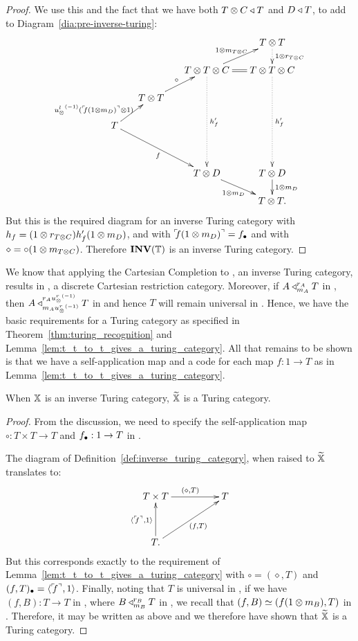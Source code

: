 \begin{proof}
  We use this and the fact that we have both $T\otimes C \triangleleft T$
  and $D \triangleleft T$, to add to   Diagram~\ref{dia:pre-inverse-turing}:
  \[
    \xymatrix @C=15pt @R=15pt{
      & & & T \* T \ar@{.>}[d]^{1\*r_{T\*C}}\\
      & & T \* T \* C \ar@{.>}[dddd]^{h'_f} \ar[ur]^{1\*m_{T\*C}} \ar@{=}[r] &T\*T\*C \ar@{.>}[dddd]^{h'_f} \\
      &T\*T \ar[ur]^{\circ} & & \\
      T \ar[ur]^(.3){\inv{\usl}(\iname{f(1\*m_D)}\*1)} \ar[ddrr]_{f} \\
      & & & \\
      && T\*D \ar[dr]_{1\*m_D} &  T\*D \ar[d]^{1\*m_D}\\
      &&&T\*T.
    }
  \]
  But this is the required diagram for an inverse Turing category with $h_f = (1\otimes r_{T\otimes C}) h'_f (1\otimes m_D)$,
  and with ${}^\ulcorner\!\!f(1\otimes m_D)^\urcorner = f_{\bullet}$ and  with $\diamond = \circ(1\otimes m_{T\otimes C})$. Therefore
  $\mathbf{INV}({\mathbb{T}})$ is an inverse Turing category.
\end{proof}

We know that applying the Cartesian Completion to \X, an inverse Turing category, results in \Xt, a
discrete Cartesian restriction category. Moreover, if $A\triangleleft_{m_A}^{r_A} T$ in \X, then $A
\triangleleft_{m_A{u_{\otimes}^r}^{(-1)}}^{r_A{u_{\otimes}^r}^{(-1)}} T$ in \Xt and hence $T$ will remain universal in
\Xt. Hence, we have the basic requirements for a Turing category as specified in
Theorem~\ref{thm:turing_recognition} and Lemma~\ref{lem:t_t_to_t_gives_a_turing_category}. All that
remains to be shown is that we have a self-application map and a code for each map $f:1\to T$ as in
Lemma~\ref{lem:t_t_to_t_gives_a_turing_category}.

\begin{theorem}\label{thm:inverse_turing_category_gives_a_turing_category}
  When $\mathbb{X}$ is an inverse Turing category, $\widetilde{\mathbb{X}}$ is a Turing category.
\end{theorem}
\begin{proof}
  From the discussion, we need to specify the self-application map $\circ:T\times T \to T$ and
  $f_{\bullet}:1 \to T$ in \Xt.

  The diagram of Definition~\ref{def:inverse_turing_category}, when raised to $\widetilde{\mathbb{X}}$
  translates to:
  \[
    \xymatrix@C+25pt@R+10pt{
      T \times T \ar[r]^{(\diamond, T)} &T \\
      T. \ar[u]^{\<\iname{f},1\>} \ar[ur]_{(f, T)}
    }
  \]
  But this corresponds exactly to the requirement of
  Lemma~\ref{lem:t_t_to_t_gives_a_turing_category} with $\circ = (\diamond,T)$ and $(f,T)_{\bullet} =
  \langle{}^\ulcorner\!\!f^\urcorner,1\rangle$.  Finally, noting that $T$ is universal in \X, if we have $(f,B):T\to T$ in \Xt,
  where $B\triangleleft_{m_B}^{r_B} T$ in \X, we recall that $(f,B) \overset{\scriptscriptstyle }{\simeq} (f(1\otimes m_B),T)$ in
  \X. Therefore, it may be  written as above and we therefore have shown that $\widetilde{\mathbb{X}}$ is a Turing
  category.
\end{proof}

